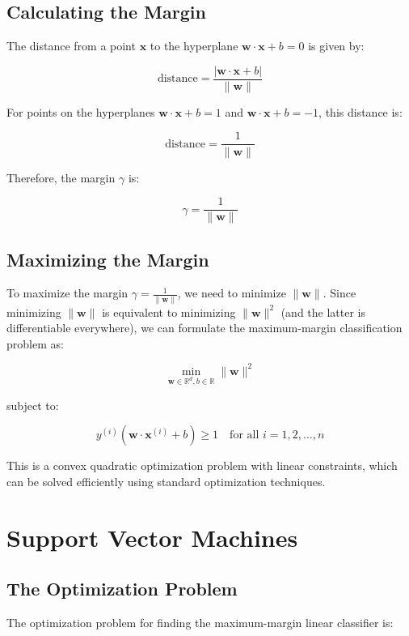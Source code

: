 \documentclass{article}
\begin{document}
\subsection{Calculating the Margin}
The distance from a point $\mathbf{x}$ to the hyperplane $\mathbf{w} \cdot \mathbf{x} + b = 0$ is given by:

\[
\text{distance} = \frac{|\mathbf{w} \cdot \mathbf{x} + b|}{\|\mathbf{w}\|}
\]

For points on the hyperplanes $\mathbf{w} \cdot \mathbf{x} + b = 1$ and $\mathbf{w} \cdot \mathbf{x} + b = -1$, this distance is:

\[
\text{distance} = \frac{1}{\|\mathbf{w}\|}
\]

Therefore, the margin $\gamma$ is:

\[
\gamma = \frac{1}{\|\mathbf{w}\|}
\]

\subsection{Maximizing the Margin}
To maximize the margin $\gamma = \frac{1}{\|\mathbf{w}\|}$, we need to minimize $\|\mathbf{w}\|$. Since minimizing $\|\mathbf{w}\|$ is equivalent to minimizing $\|\mathbf{w}\|^2$ (and the latter is differentiable everywhere), we can formulate the maximum-margin classification problem as:

\[
\min_{\mathbf{w} \in \mathbb{R}^d, b \in \mathbb{R}} \|\mathbf{w}\|^2
\]

subject to:

\[
y^{(i)}(\mathbf{w} \cdot \mathbf{x}^{(i)} + b) \geq 1 \quad \text{for all } i = 1, 2, \ldots, n
\]

This is a convex quadratic optimization problem with linear constraints, which can be solved efficiently using standard optimization techniques.

\section{Support Vector Machines}

\subsection{The Optimization Problem}
The optimization problem for finding the maximum-margin linear classifier is:

\end{document}
